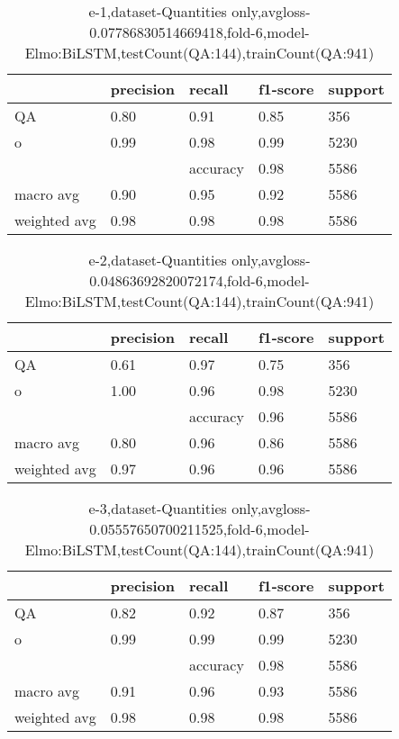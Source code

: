 \begin{table}[!ht] 
\centering
\caption{e-1,dataset-Quantities only,avgloss-0.07786830514669418,fold-6,model-Elmo:BiLSTM,testCount(QA:144),trainCount(QA:941)}\label{e-1data-quantS.tsv}
\begin{tabularx}{300pt}{|X|X|X|X|X|}
\hline
&precision&recall&f1-score&support\\
\hline
QA&0.80&0.91&0.85&356\\
\hline
o&0.99&0.98&0.99&5230\\
\hline
&&accuracy&0.98&5586\\
\hline
macro avg&0.90&0.95&0.92&5586\\
\hline
weighted avg&0.98&0.98&0.98&5586\\
\hline
\end{tabularx}
\end{table}
\begin{table}[!ht] 
\centering
\caption{e-2,dataset-Quantities only,avgloss-0.04863692820072174,fold-6,model-Elmo:BiLSTM,testCount(QA:144),trainCount(QA:941)}\label{e-2data-quantS.tsv}
\begin{tabularx}{300pt}{|X|X|X|X|X|}
\hline
&precision&recall&f1-score&support\\
\hline
QA&0.61&0.97&0.75&356\\
\hline
o&1.00&0.96&0.98&5230\\
\hline
&&accuracy&0.96&5586\\
\hline
macro avg&0.80&0.96&0.86&5586\\
\hline
weighted avg&0.97&0.96&0.96&5586\\
\hline
\end{tabularx}
\end{table}
\begin{table}[!ht] 
\centering
\caption{e-3,dataset-Quantities only,avgloss-0.05557650700211525,fold-6,model-Elmo:BiLSTM,testCount(QA:144),trainCount(QA:941)}\label{e-3data-quantS.tsv}
\begin{tabularx}{300pt}{|X|X|X|X|X|}
\hline
&precision&recall&f1-score&support\\
\hline
QA&0.82&0.92&0.87&356\\
\hline
o&0.99&0.99&0.99&5230\\
\hline
&&accuracy&0.98&5586\\
\hline
macro avg&0.91&0.96&0.93&5586\\
\hline
weighted avg&0.98&0.98&0.98&5586\\
\hline
\end{tabularx}
\end{table}
